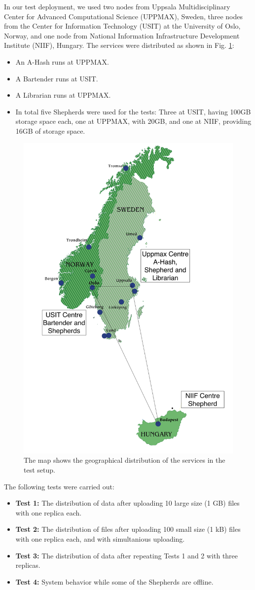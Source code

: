 \documentclass{llncs}
\begin{document}
In our test deployment, we used two nodes from Uppsala
Multidisciplinary Center for Advanced Computational Science (UPPMAX), Sweden, 
three nodes from the Center for Information Technology (USIT) at the
University of Oslo, Norway, 
and one node from National Information Infrastructure Development Institute (NIIF),
Hungary. %
The services were distributed as shown in Fig. \ref{fig:map}:


\begin{itemize}
\item An A-Hash runs at UPPMAX.
\item A Bartender runs at USIT.
\item A Librarian runs at UPPMAX.
\item In total five Shepherds were used for the tests: Three at USIT, having
  100GB storage space each, one at UPPMAX, with 20GB, and one at NIIF, providing 16GB of storage space.
 \end{itemize}

\begin{figure}
\includegraphics[width=0.35\columnwidth]{map}
\caption{The map shows the geographical distribution of the services in the test setup.}
\label{fig:map}
\end{figure}  

The following tests were carried out:
\begin{itemize}
\item \textbf{Test 1:} The distribution of data after uploading 10 large size (1 GB)
  files with one replica each.  
\item \textbf{Test 2:} The distribution of files after uploading 100 small size (1 kB)
  files with one replica each, and with simultanious uploading.
\item \textbf{Test 3:} The distribution of data after repeating Tests 1 and 2 with three replicas.  
\item \textbf{Test 4:} System behavior while some of the Shepherds are offline.   
\end{itemize}
\end{document}
